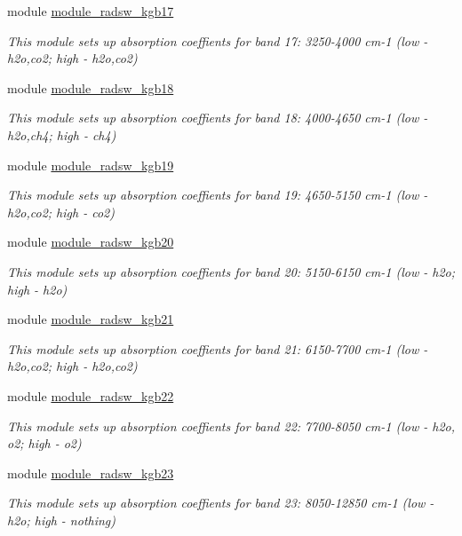 \begin{DoxyCompactItemize}
module \hyperlink{namespacemodule__radsw__kgb17}{module\+\_\+radsw\+\_\+kgb17}
\begin{DoxyCompactList}\small\item\em This module sets up absorption coeffients for band 17\+: 3250-\/4000 cm-\/1 (low -\/ h2o,co2; high -\/ h2o,co2) \end{DoxyCompactList}\item 
module \hyperlink{namespacemodule__radsw__kgb18}{module\+\_\+radsw\+\_\+kgb18}
\begin{DoxyCompactList}\small\item\em This module sets up absorption coeffients for band 18\+: 4000-\/4650 cm-\/1 (low -\/ h2o,ch4; high -\/ ch4) \end{DoxyCompactList}\item 
module \hyperlink{namespacemodule__radsw__kgb19}{module\+\_\+radsw\+\_\+kgb19}
\begin{DoxyCompactList}\small\item\em This module sets up absorption coeffients for band 19\+: 4650-\/5150 cm-\/1 (low -\/ h2o,co2; high -\/ co2) \end{DoxyCompactList}\item 
module \hyperlink{namespacemodule__radsw__kgb20}{module\+\_\+radsw\+\_\+kgb20}
\begin{DoxyCompactList}\small\item\em This module sets up absorption coeffients for band 20\+: 5150-\/6150 cm-\/1 (low -\/ h2o; high -\/ h2o) \end{DoxyCompactList}\item 
module \hyperlink{namespacemodule__radsw__kgb21}{module\+\_\+radsw\+\_\+kgb21}
\begin{DoxyCompactList}\small\item\em This module sets up absorption coeffients for band 21\+: 6150-\/7700 cm-\/1 (low -\/ h2o,co2; high -\/ h2o,co2) \end{DoxyCompactList}\item 
module \hyperlink{namespacemodule__radsw__kgb22}{module\+\_\+radsw\+\_\+kgb22}
\begin{DoxyCompactList}\small\item\em This module sets up absorption coeffients for band 22\+: 7700-\/8050 cm-\/1 (low -\/ h2o, o2; high -\/ o2) \end{DoxyCompactList}\item 
module \hyperlink{namespacemodule__radsw__kgb23}{module\+\_\+radsw\+\_\+kgb23}
\begin{DoxyCompactList}\small\item\em This module sets up absorption coeffients for band 23\+: 8050-\/12850 cm-\/1 (low -\/ h2o; high -\/ nothing) \end{DoxyCompactList}\item 

\end{DoxyCompactItemize}
